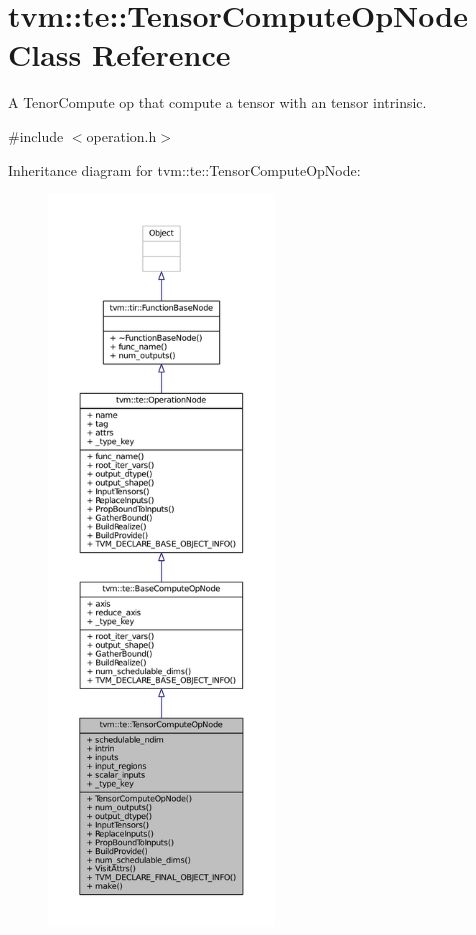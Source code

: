 \hypertarget{classtvm_1_1te_1_1TensorComputeOpNode}{}\section{tvm\+:\+:te\+:\+:Tensor\+Compute\+Op\+Node Class Reference}
\label{classtvm_1_1te_1_1TensorComputeOpNode}


A Tenor\+Compute op that compute a tensor with an tensor intrinsic.  




{\ttfamily \#include $<$operation.\+h$>$}



Inheritance diagram for tvm\+:\+:te\+:\+:Tensor\+Compute\+Op\+Node\+:
\nopagebreak
\begin{figure}[H]
\begin{center}
\leavevmode
\includegraphics[height=550pt]{classtvm_1_1te_1_1TensorComputeOpNode__inherit__graph}
\end{center}
\end{figure}


